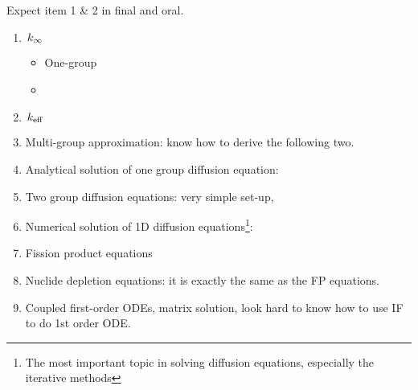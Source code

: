 \documentclass{school-22.211-notes}
\begin{document}
\begin{enumerate}
\end{enumerate}


\clearpage
{}
Expect item 1 \& 2 in final and oral. 
\begin{enumerate}
\item $\left. k_{\infty} \right.$ 
  \begin{itemize}
  \item One-group
  \item 
  \end{itemize}

\item $\left. k_{\mathrm{eff}} \right.$


\item Multi-group approximation: know how to derive the following two. 

\item Analytical solution of one group diffusion equation: 

\item Two group diffusion equations: very simple set-up,

\item Numerical solution of 1D diffusion equations\footnote{The most important topic in solving diffusion equations, especially the iterative methods}: 

\item Fission product equations

\item Nuclide depletion equations: it is exactly the same as the FP equations. 

\item Coupled first-order ODEs, matrix solution, look hard to know how to use IF to do 1st order ODE. 
\end{enumerate}
\end{document}
